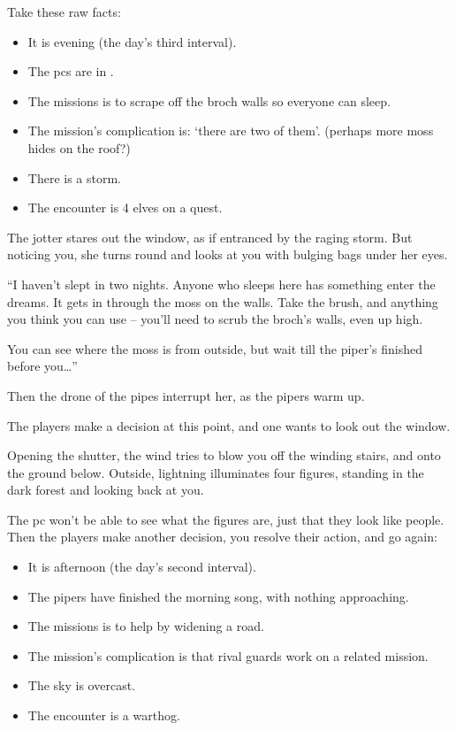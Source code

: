 \begin{multicols}{2}
Take these raw facts:

\begin{itemize}
  \item
  It is evening (the day's third \gls{interval}).
  \item
  The \glspl{pc} are in .
  \item
  The missions is to scrape  off the \gls{broch} walls so everyone can sleep.
  \item
  The mission's complication is: `there are two of them'.
  (perhaps more moss hides on the roof?)
  \item
  There is a storm.
  \item
  The encounter is 4 elves on a quest.
\end{itemize}

\begin{boxtext}
  The \gls{jotter} stares out the window, as if entranced by the raging storm.
  But noticing you, she turns round and looks at you with bulging bags under her eyes.

  ``I haven't slept in two nights.
  Anyone who sleeps here has something enter the dreams.
  It gets in through the moss on the walls.
  Take the brush, and anything you think you can use -- you'll need to scrub the \gls{broch}'s walls, even up high.

  You can see where the moss is from outside, but wait till the piper's finished before you\ldots''

  Then the drone of the pipes interrupt her, as the pipers warm up.
\end{boxtext}

The players make a decision at this point, and one wants to look out the window.

\begin{boxtext}
  Opening the shutter, the wind tries to blow you off the winding stairs, and onto the ground below.
  Outside, lightning illuminates four figures, standing in the dark forest and looking back at you.
\end{boxtext}

The \gls{pc} won't be able to see what the figures are, just that they look like people.
Then the players make another decision, you resolve their action, and go again:

\begin{itemize}
  \item
  It is afternoon (the day's second \gls{interval}).
  \item
  The pipers have finished the morning song, with nothing approaching.
  \item
  The missions is to help  by widening a road.
  \item
  The mission's complication is that rival \glspl{guard} work on a related mission.
  \item
  The sky is overcast.
  \item
  The encounter is a warthog.
\end{itemize}


\end{multicols}
